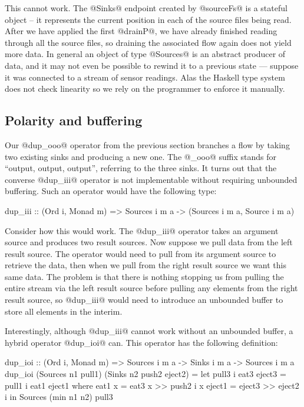 This cannot work. The @Sinks@ endpoint created by @sourceFs@ is a stateful object -- it represents the current position in each of the source files being read. After we have applied the first @drainP@, we have already finished reading through all the source files, so draining the associated flow again does not yield more data. In general an object of type @Sources@ is an abstract producer of data, and it may not even be possible to rewind it to a previous state --- suppose it was connected to a stream of sensor readings. Alas the Haskell type system does not check linearity so we rely on the programmer to enforce it manually.


\subsection{Polarity and buffering}
\label{s:Polarity}
Our @dup_ooo@ operator from the previous section branches a flow by taking two existing sinks and producing a new one. The @_ooo@ suffix stands for ``output, output, output'', referring to the three sinks. It turns out that the converse @dup_iii@ operator is not implementable without requiring unbounded buffering. Such an operator would have the following type:
\begin{code}
 dup_iii :: (Ord i, Monad m)
         =>  Sources i m a 
         -> (Sources i m a, Source i m a)
\end{code}

Consider how this would work. The @dup_iii@ operator takes an argument source and produces two result sources. Now suppose we pull data from the left result source. The operator would need to pull from its argument source to retrieve the data, then when we pull from the right result source we want this same data. The problem is that there is nothing stopping us from pulling the entire stream via the left result source before pulling any elements from the right result source, so @dup_iii@ would need to introduce an unbounded buffer to store all elements in the interim.

Interestingly, although @dup_iii@ cannot work without an unbounded buffer, a hybrid operator @dup_ioi@ can. This operator has the following definition:
\begin{code}
dup_ioi :: (Ord i, Monad m)
        => Sources i m a -> Sinks i m a 
        -> Sources i m a
dup_ioi (Sources n1 pull1) (Sinks n2 push2 eject2)
 = let pull3 i eat3 eject3
        = pull1 i eat1 eject1
        where eat1 x = eat3 x >> push2  i x
              eject1 = eject3 >> eject2 i
   in  Sources (min n1 n2) pull3
\end{code}

